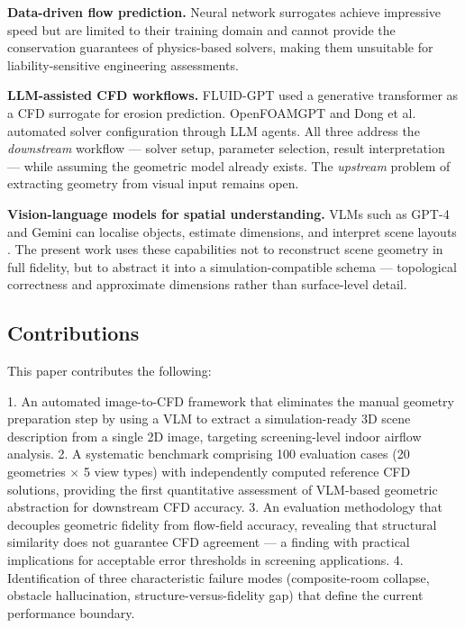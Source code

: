\documentclass[preprint,12pt,number]{elsarticle}
\begin{document}
\textbf{Data-driven flow prediction.} Neural network surrogates \cite{guo.etal2016ConvolutionalNeural,calzolari.liu2021DeepLearning,kastner.dogan2023GANBasedSurrogate} achieve impressive speed but are limited to their training domain and cannot provide the conservation guarantees of physics-based solvers, making them unsuitable for liability-sensitive engineering assessments.

\textbf{LLM-assisted CFD workflows.} FLUID-GPT \cite{yang.etal2023FLUIDGPTFast} used a generative transformer as a CFD surrogate for erosion prediction. OpenFOAMGPT \cite{pandey.etal2025OpenFOAMGPTRetrievalaugmented} and Dong et al. \cite{dong.etal2025FinetuningLarge} automated solver configuration through LLM agents. All three address the \textit{downstream} workflow --- solver setup, parameter selection, result interpretation --- while assuming the geometric model already exists. The \textit{upstream} problem of extracting geometry from visual input remains open.

\textbf{Vision-language models for spatial understanding.} VLMs such as GPT-4 \cite{openai.etal2023GPT4Technical} and Gemini \cite{geminiteam.etal2023GeminiFamily} can localise objects, estimate dimensions, and interpret scene layouts \cite{chen.etal2024SpatialVLMEndowing,hong.etal20233DLLMInjecting}. The present work uses these capabilities not to reconstruct scene geometry in full fidelity, but to abstract it into a simulation-compatible schema --- topological correctness and approximate dimensions rather than surface-level detail.

\subsection{Contributions}
\label{sec:contributions}


This paper contributes the following:

1. An automated image-to-CFD framework that eliminates the manual geometry preparation step by using a VLM to extract a simulation-ready 3D scene description from a single 2D image, targeting screening-level indoor airflow analysis.
2. A systematic benchmark comprising 100 evaluation cases (20 geometries $\times$ 5 view types) with independently computed reference CFD solutions, providing the first quantitative assessment of VLM-based geometric abstraction for downstream CFD accuracy.
3. An evaluation methodology that decouples geometric fidelity from flow-field accuracy, revealing that structural similarity does not guarantee CFD agreement --- a finding with practical implications for acceptable error thresholds in screening applications.
4. Identification of three characteristic failure modes (composite-room collapse, obstacle hallucination, structure-versus-fidelity gap) that define the current performance boundary.
\end{document}
